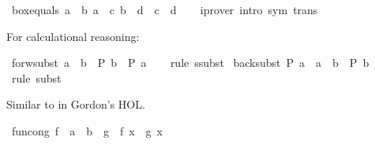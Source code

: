 \begin{isabellebody}
\isamarkupfalse%
\ box{\isacharunderscore}{\kern0pt}equals{\isacharcolon}{\kern0pt}\ {\isachardoublequoteopen}{\isasymlbrakk}a\ {\isacharequal}{\kern0pt}\ b{\isacharsemicolon}{\kern0pt}\ a\ {\isacharequal}{\kern0pt}\ c{\isacharsemicolon}{\kern0pt}\ b\ {\isacharequal}{\kern0pt}\ d{\isasymrbrakk}\ {\isasymLongrightarrow}\ c\ {\isacharequal}{\kern0pt}\ d{\isachardoublequoteclose}\isanewline
%
\isadelimproof
\ \ %
\endisadelimproof
%
\isatagproof
{}\isamarkupfalse%
\ {\isacharparenleft}{\kern0pt}iprover\ intro{\isacharcolon}{\kern0pt}\ sym\ trans{\isacharparenright}{\kern0pt}%
\endisatagproof
{\isafoldproof}%
%
\isadelimproof
%
\endisadelimproof
%
\begin{isamarkuptext}%
For calculational reasoning:%
\end{isamarkuptext}\isamarkuptrue%
\isamarkupfalse%
\ forw{\isacharunderscore}{\kern0pt}subst{\isacharcolon}{\kern0pt}\ {\isachardoublequoteopen}a\ {\isacharequal}{\kern0pt}\ b\ {\isasymLongrightarrow}\ P\ b\ {\isasymLongrightarrow}\ P\ a{\isachardoublequoteclose}\isanewline
%
\isadelimproof
\ \ %
\endisadelimproof
%
\isatagproof
{}\isamarkupfalse%
\ {\isacharparenleft}{\kern0pt}rule\ ssubst{\isacharparenright}{\kern0pt}%
\endisatagproof
{\isafoldproof}%
%
\isadelimproof
\isanewline
%
\endisadelimproof
\isanewline
{}\isamarkupfalse%
\ back{\isacharunderscore}{\kern0pt}subst{\isacharcolon}{\kern0pt}\ {\isachardoublequoteopen}P\ a\ {\isasymLongrightarrow}\ a\ {\isacharequal}{\kern0pt}\ b\ {\isasymLongrightarrow}\ P\ b{\isachardoublequoteclose}\isanewline
%
\isadelimproof
\ \ %
\endisadelimproof
%
\isatagproof
{}\isamarkupfalse%
\ {\isacharparenleft}{\kern0pt}rule\ subst{\isacharparenright}{\kern0pt}%
\endisatagproof
{\isafoldproof}%
%
\isadelimproof
%
\endisadelimproof
%
\isadelimdocument
%
\endisadelimdocument
%
\isatagdocument
%
\isamarkuptrue%
%
\endisatagdocument
{\isafolddocument}%
%
\isadelimdocument
%
\endisadelimdocument
%
\begin{isamarkuptext}%
Similar to  in Gordon's HOL.%
\end{isamarkuptext}\isamarkuptrue%
\isamarkupfalse%
\ fun{\isacharunderscore}{\kern0pt}cong{\isacharcolon}{\kern0pt}\ {\isachardoublequoteopen}{\isacharparenleft}{\kern0pt}f\ {\isacharcolon}{\kern0pt}{\isacharcolon}{\kern0pt}\ {\isacharprime}{\kern0pt}a\ {\isasymRightarrow}\ {\isacharprime}{\kern0pt}b{\isacharparenright}{\kern0pt}\ {\isacharequal}{\kern0pt}\ g\ {\isasymLongrightarrow}\ f\ x\ {\isacharequal}{\kern0pt}\ g\ x{\isachardoublequoteclose}\isanewline

\end{isabellebody}
